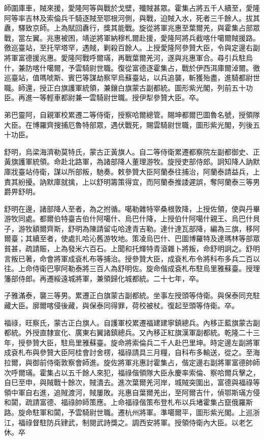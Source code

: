 \begin{pinyinscope}
師圍庫車，賊來援，愛隆阿等與戰於戈壁，殲賊甚眾。霍集占將五千人續至，愛隆阿等率吉林及索倫兵千騎逐賊至鄂根河側，與戰，迫賊入水，死者三千餘人。拔其纛，驛致京師。上為賦回纛行，獎其能戰。旋從將軍兆惠至葉爾羌，與霍集占部眾戰，當左翼。兆惠被困，靖逆將軍納穆札爾赴援，愛隆阿將兵截喀什噶爾賊援路。徼巡臺站，至托罕塔罕，遇賊，剿殺百餘人。上授愛隆阿參贊大臣，令與定邊右副將軍富德援兆惠。愛隆阿戰呼爾璊，再戰葉爾羌河，遂與兆惠軍合。尋引兵駐烏什，兼防喀什噶爾，予雲騎尉世職。復從富德逐霍集占，戰於伊西洱庫爾淖爾。徼巡臺站，值嗎唬斯、賓巴等謀劫察罕烏蘇臺站，以兵追襲，斬獲殆盡，進騎都尉世職。師還，授正白旗護軍統領，兼鑲白旗蒙古副都統。圖形紫光閣，列前五十功臣。再進一等輕車都尉兼一雲騎尉世職。授伊犁參贊大臣。卒。

弟巴靈阿，自親軍校累遷二等侍衛，授察哈爾總管。賜坤都爾巴圖魯名號，授領隊大臣。在博羅齊搜捕厄魯特部眾，遇伏戰死，賜雲騎尉世職，圖形紫光閣，列後五十功臣。

舒明，烏梁海濟勒莫特氏，蒙古正黃旗人。自二等侍衛累遷都察院左副都御史、正黃旗護軍統領。命赴北路軍，為諸部降人董理游牧。旋授吏部侍郎。詗知降人訥默庫戕臺站侍衛，謀以所部叛，馳奏。敕參贊大臣阿蘭泰往捕治，阿蘭泰請益兵，上責其紛擾。訥默庫就擒，上以舒明籌策得宜，而阿蘭泰推諉遲誤，奪阿蘭泰三等男爵畀舒明。

舒明在邊，諸部降人至者，為之拊循。噶勒雜特宰桑根敦降，上授佐領，使與丹畢游牧同處。都爾伯特臺吉伯什阿噶什、烏巴什降，上授伯什阿噶什親王、烏巴什貝子，游牧額爾齊斯，舒明為陳請留屯哈達青吉勒。達什達瓦部降，編為三旗，移阿爾臺；其續至者，使處扎哈沁舊游牧地。策凌烏巴什、巴圖博羅特及達瑪林等部眾貧甚，疏請賑，上為發米六百石。上聞和托輝特青滾雜卜將叛，命舒明詗之。舒明言叛已著，命會將軍成袞札布等捕治。授參贊大臣，成袞札布令將科布多兵二百以往。上命侍衛巴寧阿勒泰將三百人為舒明佐。旋命偕成袞札布駐烏里雅蘇臺。授理籓部侍郎。再遷綏遠城將軍，兼領歸化城都統。二十七年，卒。

子雅滿泰，襲三等男。累遷正白旗蒙古副都統。坐事左授頭等侍衛。與保泰同充駐藏大臣。廓爾喀侵後藏，與保泰同得罪，荷校被杖。復起至頭等侍衛。卒。

福祿，旺察氏，蒙古正白旗人。自護軍校累遷福建建寧鎮總兵。內移正藍旗蒙古副都統。外授直隸宣化、廣東右翼諸鎮總兵。又內移正紅旗漢軍副都統。乾隆二十三年，授參贊大臣，駐烏里雅蘇臺。旋命將索倫兵二千人赴巴里坤。時定邊左副將軍成袞札布與參贊大臣阿桂會討舍楞，福祿請具三月糧，自科布多輸送，從之。至海拉爾，與御前侍衛敦察會師進。旋佐將軍兆惠討霍集占，偕定邊右副將軍富德帥師次呼爾璊。霍集占以五千餘人來犯，福祿偕領隊大臣永慶率索倫、察哈爾兵擊之，自巳至申，與賊戰十餘次，賊潰去。進次葉爾羌河岸，城賊突圍出，富德與福祿等領中軍自右進，追賊渡河，賊屢敗。兆惠自葉爾羌出，至阿爾吉什，偵鄂斯璊方侵和闐，疏請富德、福祿帥師策應。上命福祿偕策布登札布以兵堵霍集占竄俄羅斯路。旋命駐軍和闐，予雲騎尉世職。遷杭州將軍。準噶爾平，圖形紫光閣。上巡浙江，福祿督駐防兵肄武，制閱武詩獎之。調西安將軍。授領侍衛內大臣。以老乞休。卒


\end{pinyinscope}
